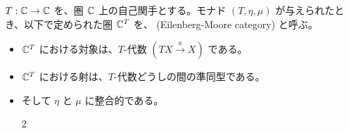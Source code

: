 \documentclass[
		head_space=20mm,
		foot_space=20mm,
		gutter=10mm,
		line_length=190mm
]{jlreq}
\begin{document}




\begin{definition}[EM圏]
	$T:\mathbb{C}\to\mathbb{C}$ を、圏 $\mathbb{C}$ 上の自己関手とする。モナド $(T,\eta,\mu)$ が与えられたとき、以下で定められた圏 $\mathbb{C}^T$ を、 (Eilenberg-Moore category) と呼ぶ。
	\begin{itemize}
		\item $\mathbb{C}^T$ における対象は、$T$-代数 $(TX\xrightarrow{a} X)$ である。
		\item $\mathbb{C}^T$ における射は、$T$-代数どうしの間の準同型である。
		\begin{prooftree}
			\doubleLine
		\end{prooftree}
		\item そして $\eta$ と $\mu$ に整合的である。\vspace{-8pt}
		\begin{multicols}{2}
			\begin{center}
			\end{center}
			\begin{center}
			\end{center}
		\end{multicols}
	\end{itemize}
\end{definition}
\end{document}
